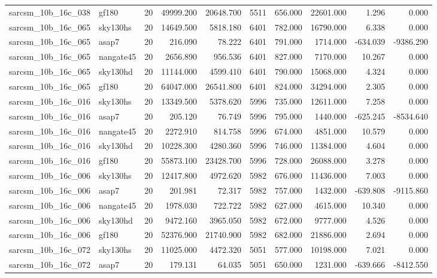 \begin{tabular}{llrrrrrrrr}
sarcsm\_10b\_16c\_038 & gf180 & 20 & 49999.200 & 20648.700 & 5511 & 656.000 & 22601.000 & 1.296 & 0.000 \\
sarcsm\_10b\_16c\_065 & sky130hs & 20 & 14649.500 & 5818.180 & 6401 & 782.000 & 16790.000 & 6.338 & 0.000 \\
sarcsm\_10b\_16c\_065 & asap7 & 20 & 216.090 & 78.222 & 6401 & 791.000 & 1714.000 & -634.039 & -9386.290 \\
sarcsm\_10b\_16c\_065 & nangate45 & 20 & 2656.890 & 956.536 & 6401 & 827.000 & 7170.000 & 10.267 & 0.000 \\
sarcsm\_10b\_16c\_065 & sky130hd & 20 & 11144.000 & 4599.410 & 6401 & 790.000 & 15068.000 & 4.324 & 0.000 \\
sarcsm\_10b\_16c\_065 & gf180 & 20 & 64047.000 & 26541.800 & 6401 & 824.000 & 34294.000 & 2.305 & 0.000 \\
sarcsm\_10b\_16c\_016 & sky130hs & 20 & 13349.500 & 5378.620 & 5996 & 735.000 & 12611.000 & 7.258 & 0.000 \\
sarcsm\_10b\_16c\_016 & asap7 & 20 & 205.120 & 76.749 & 5996 & 795.000 & 1440.000 & -625.245 & -8534.640 \\
sarcsm\_10b\_16c\_016 & nangate45 & 20 & 2272.910 & 814.758 & 5996 & 674.000 & 4851.000 & 10.579 & 0.000 \\
sarcsm\_10b\_16c\_016 & sky130hd & 20 & 10228.300 & 4280.360 & 5996 & 746.000 & 11384.000 & 4.604 & 0.000 \\
sarcsm\_10b\_16c\_016 & gf180 & 20 & 55873.100 & 23428.700 & 5996 & 728.000 & 26088.000 & 3.278 & 0.000 \\
sarcsm\_10b\_16c\_006 & sky130hs & 20 & 12417.800 & 4972.620 & 5982 & 676.000 & 11436.000 & 7.003 & 0.000 \\
sarcsm\_10b\_16c\_006 & asap7 & 20 & 201.981 & 72.317 & 5982 & 757.000 & 1432.000 & -639.808 & -9115.860 \\
sarcsm\_10b\_16c\_006 & nangate45 & 20 & 1978.030 & 722.722 & 5982 & 627.000 & 4615.000 & 10.340 & 0.000 \\
sarcsm\_10b\_16c\_006 & sky130hd & 20 & 9472.160 & 3965.050 & 5982 & 672.000 & 9777.000 & 4.526 & 0.000 \\
sarcsm\_10b\_16c\_006 & gf180 & 20 & 52376.900 & 21740.900 & 5982 & 682.000 & 21886.000 & 2.694 & 0.000 \\
sarcsm\_10b\_16c\_072 & sky130hs & 20 & 11025.000 & 4472.320 & 5051 & 577.000 & 10198.000 & 7.021 & 0.000 \\
sarcsm\_10b\_16c\_072 & asap7 & 20 & 179.131 & 64.035 & 5051 & 650.000 & 1231.000 & -639.666 & -8412.550 \\

\end{tabular}
